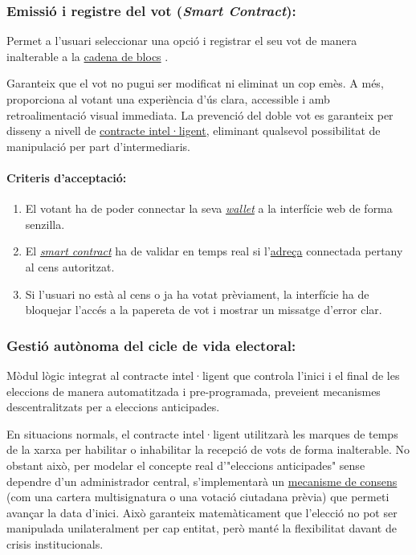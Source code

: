 \subsubsection{Emissió i registre del vot (\textit{Smart Contract}):}
Permet a l'usuari seleccionar una opció i registrar el seu vot de manera inalterable a la \hyperlink{def:blockchain}{cadena de blocs} \cite{nakamoto}.

Garanteix que el vot no pugui ser modificat ni eliminat un cop emès. 
A més, proporciona al votant una experiència d'ús clara, accessible i amb retroalimentació visual immediata. La prevenció del doble vot es garanteix per disseny a nivell de \hyperlink{def:smartcontract}{contracte intel·ligent}, eliminant qualsevol possibilitat de manipulació per part d'intermediaris.

\paragraph{Criteris d'acceptació:}
\begin{enumerate}[label=\roman*.]
    \item El votant ha de poder connectar la seva \hyperlink{def:wallet}{\textit{wallet}} a la interfície web de forma senzilla.
    \item El \hyperlink{def:smartcontract}{\textit{smart contract}} ha de validar en temps real si l'\hyperlink{def:adreca}{adreça} connectada pertany al cens autoritzat.
    \item Si l'usuari no està al cens o ja ha votat prèviament, la interfície ha de bloquejar l'accés a la papereta de vot i mostrar un missatge d'error clar.
\end{enumerate}

\subsubsection{Gestió autònoma del cicle de vida electoral:}
Mòdul lògic integrat al contracte intel·ligent que controla l'inici i el final de les eleccions de manera automatitzada i pre-programada, preveient mecanismes descentralitzats per a eleccions anticipades.

En situacions normals, el contracte intel·ligent utilitzarà les marques de temps de la xarxa per habilitar o inhabilitar la recepció de vots de forma inalterable. 
No obstant això, per modelar el concepte real d'"eleccions anticipades" sense dependre d'un administrador central, s'implementarà un \hyperlink{def:consensus}{mecanisme de consens} (com una cartera multisignatura o una votació ciutadana prèvia) que permeti avançar la data d'inici. 
Això garanteix matemàticament que l'elecció no pot ser manipulada unilateralment per cap entitat, però manté la flexibilitat davant de crisis institucionals.



